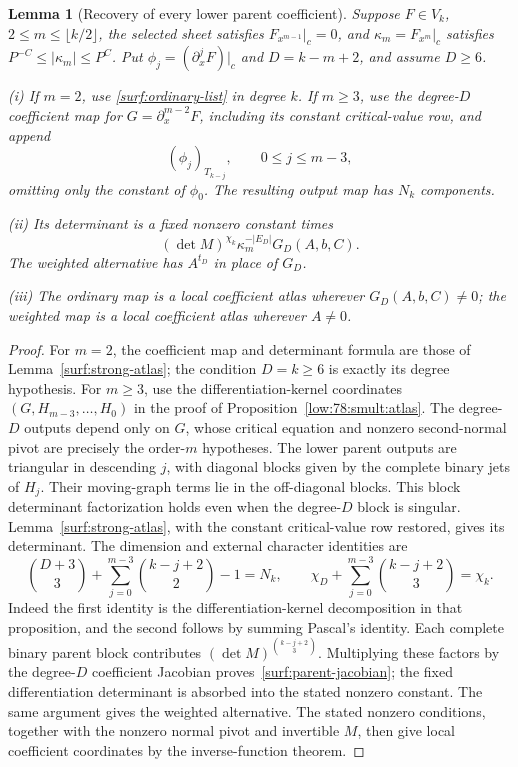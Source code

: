 \documentclass[11pt]{amsart}
\newtheorem{lemma}[theorem]{Lemma}
\theoremstyle{definition}
\theoremstyle{remark}
\numberwithin{equation}{section}
\begin{document}
\begin{lemma}[Recovery of every lower parent coefficient]\label{surf:parent-lift}
Suppose $F\in V_k$, $2\le m\le\lfloor k/2\rfloor$, the selected sheet satisfies $F_{x^{m-1}}|_c=0$, and $\kappa_m=F_{x^m}|_c$ satisfies $P^{-C}\le|\kappa_m|\le P^C$. Put $\phi_j=(\partial_x^jF)|_c$ and $D=k-m+2$, and assume $D\ge6$.

\noindent\textup{(i)} If $m=2$, use \eqref{surf:ordinary-list} in degree $k$. If $m\ge3$, use the degree-$D$ coefficient map for $G=\partial_x^{m-2}F$, including its constant critical-value row, and append
\[
 (\phi_j)_{T_{k-j}},\qquad 0\le j\le m-3,
\]
omitting only the constant of $\phi_0$. The resulting output map has $N_k$ components.

\noindent\textup{(ii)} Its determinant is a fixed nonzero constant times
\begin{equation}\label{surf:parent-jacobian}
 (\det M)^{\chi_k}\kappa_m^{-|E_D|}G_D(A,b,C).
\end{equation}
The weighted alternative has $A^{t_D}$ in place of $G_D$.

\noindent\textup{(iii)} The ordinary map is a local coefficient atlas wherever $G_D(A,b,C)\ne0$; the weighted map is a local coefficient atlas wherever $A\ne0$.
\end{lemma}
\begin{proof}
For $m=2$, the coefficient map and determinant formula are those of Lemma~\ref{surf:strong-atlas}; the condition $D=k\ge6$ is exactly its degree hypothesis. For $m\ge3$, use the differentiation-kernel coordinates $(G,H_{m-3},\ldots,H_0)$ in the proof of Proposition~\ref{low:78:smult:atlas}. The degree-$D$ outputs depend only on $G$, whose critical equation and nonzero second-normal pivot are precisely the order-$m$ hypotheses. The lower parent outputs are triangular in descending $j$, with diagonal blocks given by the complete binary jets of $H_j$. Their moving-graph terms lie in the off-diagonal blocks. This block determinant factorization holds even when the degree-$D$ block is singular. Lemma~\ref{surf:strong-atlas}, with the constant critical-value row restored, gives its determinant. The dimension and external character identities are
\[
 \binom{D+3}{3}+\sum_{j=0}^{m-3}\binom{k-j+2}{2}-1=N_k,
 \qquad \chi_D+\sum_{j=0}^{m-3}\binom{k-j+2}{3}=\chi_k.
\]
Indeed the first identity is the differentiation-kernel decomposition in that proposition, and the second follows by summing Pascal's identity. Each complete binary parent block contributes $(\det M)^{\binom{k-j+2}{3}}$. Multiplying these factors by the degree-$D$ coefficient Jacobian proves~\eqref{surf:parent-jacobian}; the fixed differentiation determinant is absorbed into the stated nonzero constant. The same argument gives the weighted alternative. The stated nonzero conditions, together with the nonzero normal pivot and invertible $M$, then give local coefficient coordinates by the inverse-function theorem.
\end{proof}
\end{document}
